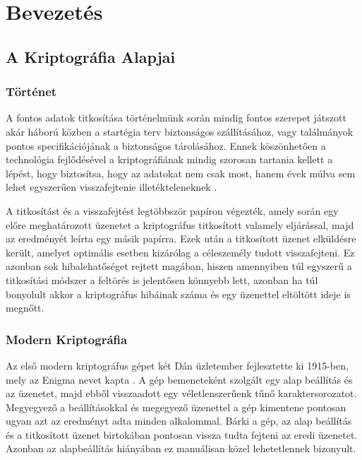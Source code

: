 \chapter{Bevezetés} %
\label{ch:intro}


\section{A Kriptográfia Alapjai}

\subsection{Történet}
A fontos adatok titkosítása történelmünk során mindig fontos szerepet játszott akár háború közben a startégia terv biztonságos szállításához, vagy találmányok pontos specifikációjának a biztonságos tárolásához. Ennek köszönhetően a technológia fejlődésével a kriptográfiának mindig szorosan tartania kellett a lépést, hogy biztosítsa, hogy az adatokat nem csak most, hanem évek múlva sem lehet egyszerűen visszafejtenie illetékteleneknek \cite{katz2020introduction}.

A titkosítást és a visszafejtést legtöbbször papíron végezték, amely során egy előre meghatározott üzenetet a kriptográfus titkosított valamely eljárással, majd az eredményét leírta egy másik papírra. Ezek után a titkosított üzenet elküldésre került, amelyet optimális esetben kizárólag a céleszemély tudott visszafejteni. Ez azonban sok hibalehatőséget rejtett magában, hiszen amennyiben túl egyszerű a titkosítási módszer a feltörés is jelentősen könnyebb lett, azonban ha túl bonyolult akkor a kriptográfus hibáinak száma és egy üzenettel eltöltött ideje is megnőtt.

\subsection{Modern Kriptográfia}

Az első modern kriptográfus gépet két Dán üzletember fejlesztette ki 1915-ben, mely az Enigma nevet kapta \cite{ellis2005exploring}. A gép bemeneteként szolgált egy alap beállítás és az üzenetet, majd ebből visszaadott egy véletlenszerűenk tűnő karaktersorozatot. Megyegyező a beállításokkal és megegyező üzenettel a gép kimentene pontosan ugyan azt az eredményt adta minden alkalommal. Bárki a gép, az alap beállítás és a titkosított üzenet birtokában pontosan vissza tudta fejteni az eredi üzenetet. Azonban az alapbeállítás hiányában ez manuálisan közel lehetetlennek bizonyult.

